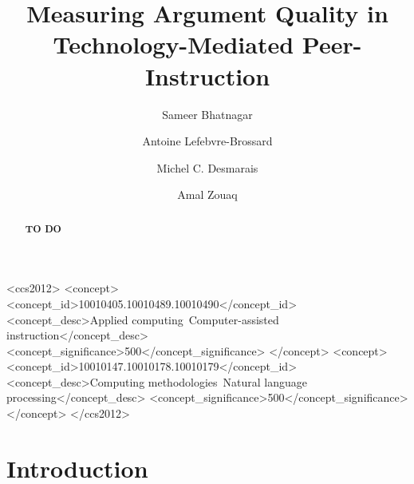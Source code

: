 \documentclass[acmsmall]{acmart}
\begin{document}
\title{Measuring Argument Quality in Technology-Mediated 
Peer-Instruction}

\author{Sameer Bhatnagar}
\author{Antoine Lefebvre-Brossard}
\author{Michel C. Desmarais}
\author{Amal Zouaq}


\renewcommand{\shortauthors}{Bhatnagar, et al.}

\begin{abstract}
\textbf{TO DO}
\end{abstract}


\begin{CCSXML}
	<ccs2012>
	<concept>
	<concept_id>10010405.10010489.10010490</concept_id>
	<concept_desc>Applied 
	computing~Computer-assisted 
	instruction</concept_desc>
	<concept_significance>500</concept_significance>
	</concept>
	<concept>
	<concept_id>10010147.10010178.10010179</concept_id>
	<concept_desc>Computing methodologies~Natural 
	language processing</concept_desc>
	<concept_significance>500</concept_significance>
	</concept>
	</ccs2012>
\end{CCSXML}





\maketitle

\section{Introduction}
\end{document}
